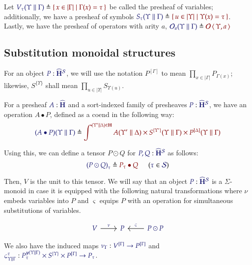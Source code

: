 \documentclass[11pt]{article}
\theoremstyle{definition}
\theoremstyle{remark}
\numberwithin{equation}{section}
\def\IModeColorName{MidnightBlue}
\def\OModeColorName{Maroon}
\newcommand\IMode[1]{{\color{\IModeColorName}{#1}}}
\newcommand\OMode[1]{{\color{\OModeColorName}{#1}}}
\newcommand\HypJ[2]{#1\ \ (#2)}
\newcommand\MkSet[1]{\left\{\,#1\,\right\}}
\newcommand\Member[2]{\IMode{#1}\in\IMode{#2}}
\newcommand\Of[2]{\IMode{#1}: \IMode{#2}}
\newcommand\Sorts{\mathcal{S}}
\newcommand\Operators{\mathcal{O}}
\newcommand\HypCat{\mathbf{H}}
\newcommand\Pair[2]{\left\langle\,#1,#2\,\right\rangle}
\newcommand\Dom[1]{\left\vert#1\right\vert}
\newcommand\Define[2]{\IMode{#1}\triangleq\OMode{#2}}
\newcommand\Yoneda[1]{\boldsymbol{y} (#1)}
\begin{document}
Let $\Define{V_\tau(\Upsilon\parallel\Gamma)}{\MkSet{x\in\Dom\Gamma\mid
\Gamma(x)=\tau}}$ be called the presheaf of variables; additionally, we have a
presheaf of symbols
$\Define{S_\tau(\Upsilon\parallel\Gamma)}{\MkSet{u\in\Dom\Upsilon\mid
\Upsilon(x)=\tau}}$. Lastly, we have the presheaf of operators with arity $a$,
$\Define{\Operators_a(\Upsilon\parallel\Gamma)}{\Operators\Pair{\Upsilon}{a}}$

\subsection{Substitution monoidal structures}

For an object $\Of{P}{\widehat{\HypCat}^\Sorts}$, we will use the notation
$P^{[\Gamma]}$ to mean $\prod_{x\in\Dom\Gamma}P_{\Gamma(x)}$; likewise,
$S^{\{\Upsilon\}}$ shall mean $\prod_{u\in\Dom\Upsilon}S_{\Upsilon(u)}$.

For a presheaf $\Of{A}{\widehat{\HypCat}}$ and a sort-indexed family of
presheaves $\Of{P}{\widehat{\HypCat}^\Sorts}$, we have an operation $A\bullet
P$, defined as a coend in the following way:
\[
  \Define{(A\bullet P)(\Upsilon\parallel\Gamma)}{
    \int^{(\Upsilon'\parallel\Delta)\in\HypCat}
      A(\Upsilon'\parallel\Delta)
      \times S^{\{\Upsilon'\}}(\Upsilon\parallel\Gamma)
      \times P^{[\Delta]}(\Upsilon\parallel\Gamma)
  }
\]

Using this, we can define a tensor $P\odot Q$ for
$\Of{P,Q}{\widehat{\HypCat}^\Sorts}$ as follows:
\[
  \HypJ{
    \Define{{(P\odot Q)}_{\tau}}{
      P_\tau\bullet Q
    }
    \quad
  }{
    \Member{\tau}{\Sorts}
  }
\]

Then, $V$ is the unit to this tensor. We will say that an object
$\Of{P}{\widehat{\HypCat}^\Sorts}$ is a $\Sigma$-monoid in case it is equipped
with the following natural transformations where $\nu$ embeds variables into
$P$ and $\varsigma$ equips $P$ with an operation for simultaneous substitutions
of variables.

\[
  \begin{tikzcd}[ampersand replacement = \&]
    {\IMode{V}} \arrow[r, "\IMode\nu"]
    \& {\IMode{P}}
    \& {\IMode{P\odot P}}
    \arrow[l, "\IMode\varsigma", swap]
  \end{tikzcd}
\]

We also have the induced maps $\Of{\nu_\Gamma}{V^{[\Gamma]}\to P^{[\Gamma]}}$
and
$\Of{\varsigma^\tau_{\Upsilon\parallel\Gamma}}{P_\tau^{\Yoneda{\Upsilon\parallel\Gamma}}
\times S^{\{\Upsilon\}}\times P^{[\Gamma]}\to P_\tau}$.
\end{document}
